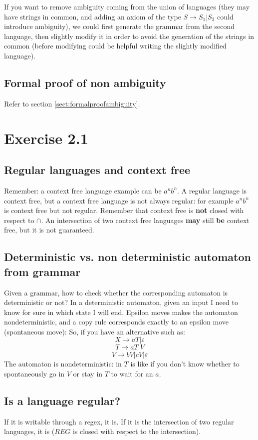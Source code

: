             If you want to remove ambiguity coming from the union of languages (they may have strings in common, and adding an axiom of the 
            type $S\rightarrow S_1\vert S_2$ could introduce ambiguity), we could first generate the grammar from the second language, then slightly modify it in 
            order to avoid the generation of the strings in common (before modifying could be helpful writing the slightly modified language).
        \subsection{Formal proof of non ambiguity}
            Refer to section \ref{sect:formalproofambiguity}.
    \section{Exercise 2.1}
        \subsection{Regular languages and context free}
            Remember: a context free language example can be $a^nb^n$. A regular language is context free, but a context free language is not always regular: for example
            $a^nb^n$ is context free but not regular. Remember that context free is \textbf{not} closed with respect to $\cap$. An intersection of two context free 
            languages \textbf{may} still \textbf{be} context free, but it is not guaranteed.
        \subsection{Deterministic vs. non deterministic automaton from grammar}
            Given a grammar, how to check whether the corresponding automaton is deterministic or not? In a deterministic automaton, given an input I need to know for 
            sure in which state I will end. Epsilon moves makes the automaton nondeterministic, and a copy rule corresponds exactly to an epsilon move (spontaneous move):
            So, if you have an alternative such as:
            $$X\rightarrow aT \vert \varepsilon$$
            $$T\rightarrow aT\vert V$$
            $$V\rightarrow bV\vert cV\vert\varepsilon$$
            The automaton is nondeterministic: in $T$ is like if you don't know whether to spontaneously go in $V$ or stay in $T$ to wait for an $a$.
        \subsection{Is a language regular?}
            If it is writable through a regex, it is. If it is the intersection of two regular languages, it is ($REG$ is closed with respect to the intersection).
